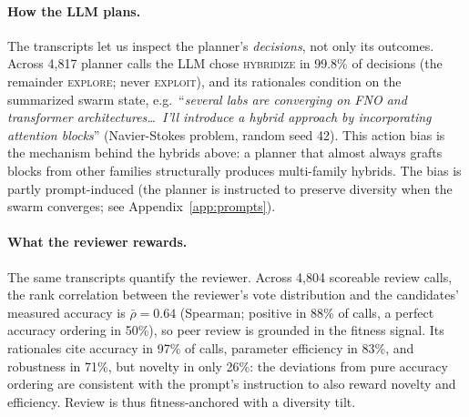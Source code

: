 \documentclass{article}
\begin{document}
\paragraph{How the LLM plans.}
The transcripts let us inspect the planner's \emph{decisions}, not only its outcomes. Across 4{,}817 planner calls the LLM chose \textsc{hybridize} in 99.8\% of decisions (the remainder \textsc{explore}; never \textsc{exploit}), and its rationales condition on the summarized swarm state, e.g.\ ``\emph{several labs are converging on FNO and transformer architectures\ldots\ I'll introduce a hybrid approach by incorporating attention blocks}'' (Navier-Stokes problem, random seed 42). This action bias is the mechanism behind the hybrids above: a planner that almost always grafts blocks from other families structurally produces multi-family hybrids. The bias is partly prompt-induced (the planner is instructed to preserve diversity when the swarm converges; see Appendix~\ref{app:prompts}). 

\paragraph{What the reviewer rewards.}
The same transcripts quantify the reviewer. Across 4{,}804 scoreable review calls, the rank correlation between the reviewer's vote distribution and the candidates' measured accuracy is $\bar{\rho}=0.64$ (Spearman; positive in 88\% of calls, a perfect accuracy ordering in 50\%), so peer review is grounded in the fitness signal. Its rationales cite accuracy in 97\% of calls, parameter efficiency in 83\%, and robustness in 71\%, but novelty in only 26\%: the deviations from pure accuracy ordering are consistent with the prompt's instruction to also reward novelty and efficiency. Review is thus fitness-anchored with a diversity tilt.

\end{document}
